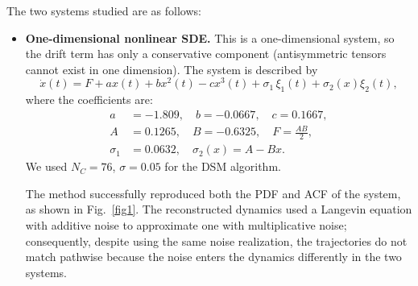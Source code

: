\documentclass[%
  prl,
  reprint,
  amsmath,
  amssymb,
  aps
]{revtex4-2}
\begin{document}
The two systems studied are as follows:
\begin{itemize}
    \item \textbf{One-dimensional nonlinear SDE.} This is a one-dimensional system, so the drift term has only a conservative component (antisymmetric tensors cannot exist in one dimension). The system is described by
    \begin{equation}
    \dot{x}(t) = F + a x(t) + b x^2(t) - c x^3(t) + \sigma_1\,\xi_1(t) + \sigma_2(x)\xi_2(t),
    \end{equation}
    where the coefficients are:
    \begin{equation}
    \begin{aligned}
    a &= -1.809, \quad b = -0.0667, \quad c = 0.1667, \\
    A &= 0.1265, \quad B = -0.6325, \quad F = \frac{A B}{2}, \\
    \sigma_1 &= 0.0632, \quad \sigma_2(x) = A - Bx.
    \end{aligned}
    \end{equation}
    We used $N_C=76$, $\sigma=0.05$ for the DSM algorithm.

    The method successfully reproduced both the PDF and ACF of the system, as shown in Fig.~\ref{fig1}. The reconstructed dynamics used a Langevin equation with additive noise to approximate one with multiplicative noise; consequently, despite using the same noise realization, the trajectories do not match pathwise because the noise enters the dynamics differently in the two systems.


\end{itemize}
\end{document}
